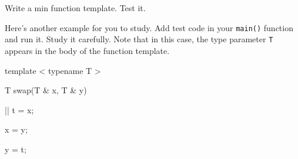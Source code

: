 Write a min function template. Test it.



Here's another example for you to study. Add test code in your \texttt{main()} function and run it. Study it carefully. Note that in this case, the type parameter \texttt{T} appears in the body of the function template.



\begin{consolethree}[escapeinside=||]

template  < typename T >



T swap(T & x, T & y)

{    

     || t = x;

     x = y;

     y = t;

} 

\end{consolethree}

